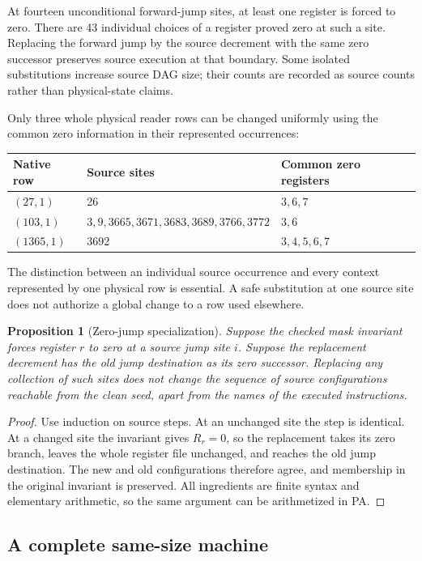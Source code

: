 \documentclass[11pt,a4paper]{article}
\newtheorem{proposition}[theorem]{Proposition}
\begin{document}
At fourteen unconditional forward-jump sites, at least one register is
forced to zero. There are 43 individual choices of a register proved zero
at such a site. Replacing the forward jump by the source decrement with
the same zero successor preserves source execution at that boundary.
Some isolated substitutions increase source DAG size; their counts are
recorded as source counts rather than physical-state claims.

Only three whole physical reader rows can be changed uniformly using the
common zero information in their represented occurrences:
\begin{center}\small
\begin{tabular}{@{}lll@{}}
\toprule
Native row & Source sites & Common zero registers\\
\midrule
$(27,1)$ & 26 & $3,6,7$\\
$(103,1)$ & $3,9,3665,3671,3683,3689,3766,3772$ & $3,6$\\
$(1365,1)$ & 3692 & $3,4,5,6,7$\\
\bottomrule
\end{tabular}
\end{center}
The distinction between an individual source occurrence and every context
represented by one physical row is essential. A safe substitution at one
source site does not authorize a global change to a row used elsewhere.

\begin{proposition}[Zero-jump specialization]
Suppose the checked mask invariant forces register $r$ to zero at a
source jump site $i$. Suppose the replacement decrement has the old jump
destination as its zero successor. Replacing any collection of such sites
does not change the sequence of source configurations reachable from the
clean seed, apart from the names of the executed instructions.
\end{proposition}
\begin{proof}
Use induction on source steps. At an unchanged site the step is identical.
At a changed site the invariant gives $R_r=0$, so the replacement takes
its zero branch, leaves the whole register file unchanged, and reaches
the old jump destination. The new and old configurations therefore agree,
and membership in the original invariant is preserved. All ingredients
are finite syntax and elementary arithmetic, so the same argument can be
arithmetized in PA.
\end{proof}

\subsection{A complete same-size machine}
\end{document}
